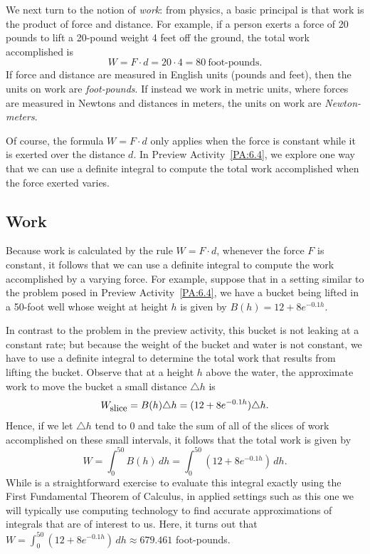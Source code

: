 We next turn to the notion of \emph{work}:  from physics, a basic principal is that work is the product of force and distance.  For example, if a person exerts a force of 20 pounds to lift a 20-pound weight 4 feet off the ground, the total work accomplished is
$$W = F \cdot d = 20 \cdot 4 = 80 \ \mbox{foot-pounds}.$$
If force and distance are measured in English units (pounds and feet), then the units on work are \emph{foot-pounds}.  If instead we work in metric units, where forces are measured in Newtons and distances in meters, the units on work are \emph{Newton-meters}.

Of course, the formula $W = F \cdot d$ only applies when the force  is constant while it is exerted over the distance $d$.  In Preview Activity~\ref{PA:6.4}, we explore one way that we can use a definite integral to compute the total work accomplished when the force exerted varies.



\subsection*{Work} 

Because work is calculated by the rule $W = F \cdot d$, whenever the force $F$ is constant, it follows that we can use a definite integral to compute the work accomplished by a varying force.  For example, suppose that in a setting similar to the problem posed in Preview Activity~\ref{PA:6.4}, we have a bucket being lifted in a 50-foot well whose weight at height $h$ is given by $B(h) = 12 + 8e^{-0.1h}$.  


In contrast to the problem in the preview activity, this bucket is not leaking at a constant rate; but because the weight of the bucket and water is not constant, we have to use a definite integral to determine the total work that results from lifting the bucket.  Observe that at a height $h$ above the water, the approximate work to move the bucket a small distance $\triangle h$ is
$$W_{\mbox{\small{slice}}} = B(h) \triangle h = (12 + 8e^{-0.1h}) \triangle h.$$
Hence, if we let $\triangle h$ tend to 0 and take the sum of all of the slices of work accomplished on these small intervals, it follows that the total work is given by
$$W = \int_0^{50} B(h) \, dh = \int_0^{50} (12 + 8e^{-0.1h}) \, dh.$$
While is a straightforward exercise to evaluate this integral exactly using the First Fundamental Theorem of Calculus, in applied settings such as this one we will typically use computing technology to find accurate approximations of integrals that are of interest to us.  Here, it turns out that $W = \int_0^{50} (12 + 8e^{-0.1h}) \, dh \approx 679.461$ foot-pounds.

